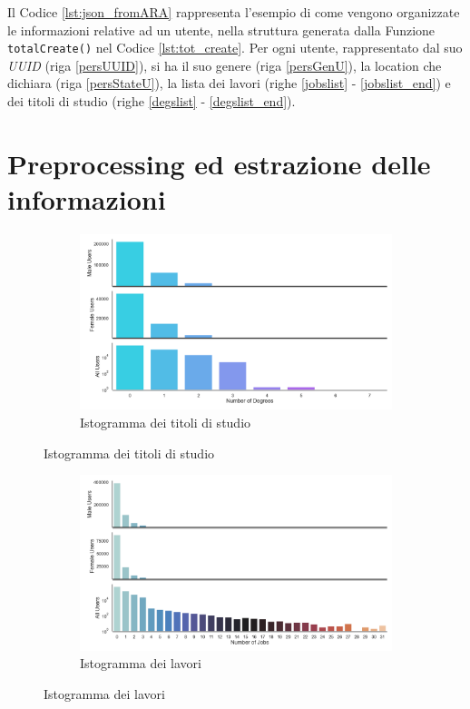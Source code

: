 Il Codice \ref{lst:json_fromARA} rappresenta l'esempio di come vengono organizzate le informazioni relative ad un utente, nella struttura generata dalla Funzione \texttt{totalCreate()} nel Codice \ref{lst:tot_create}. Per ogni utente, rappresentato dal suo \textit{UUID} (riga  \ref{persUUID}), si ha il suo genere (riga \ref{persGenU}), la location che dichiara (riga \ref{persStateU}), la lista dei lavori (righe \ref{jobslist} - \ref{jobslist_end}) e dei titoli di studio (righe \ref{degslist} - \ref{degslist_end}).


\section{Preprocessing ed estrazione delle informazioni}
\label{preprocessing}
\begin{figure}[ht]
    \begin{subfigure}{\textwidth}
        \centering
        \includegraphics[width=\textwidth]{images/histogram/degrees_histogram.png}
        \caption{Istogramma dei titoli di studio}
        \label{fig:degreesbarplot}
    \end{subfigure}
\end{figure}
\begin{figure}[tb]\ContinuedFloat
    \begin{subfigure}{\textwidth}
        \centering
        \includegraphics[width=\textwidth]{images/histogram/jobs_histogram.png}
        \caption{Istogramma dei lavori}
        \label{fig:jobsbarplot}
    \end{subfigure}
\end{figure}

